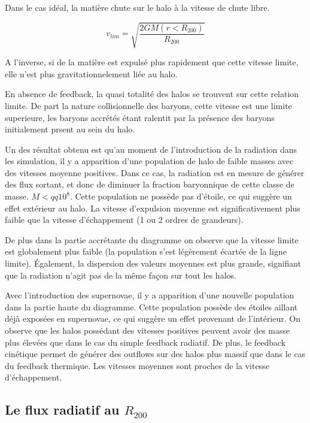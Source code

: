 Dans le cas idéal, la matière chute sur le halo à la vitesse de chute libre.

\begin{equation}
v_{lim} = \sqrt{\frac{2 GM (r<R_{200})} {R_{200}} } 
\end{equation}

A l'inverse, si de la matière est expulsé plus rapidement que cette vitesse limite, elle n'est plus gravitationnelement liée au halo.

En absence de feedback, la quasi totalité des halos se trouvent sur cette relation limite.
De part la nature collisionnelle des baryons, cette vitesse est une limite superieure, les baryons accrétés étant ralentit par la présence des baryons initialement prsent au sein du halo.

Un des résultat obtenu est qu'au moment de l'introduction de la radiation dans les simulation, il y a apparition d'une population de halo de faible masses avec des vitesses moyenne positives.
Dans ce cas, la radiation est en mesure de générer des flux sortant, et donc de diminuer la fraction baryonnique de cette classe de masse. $M<qq 10^8$.
Cette population ne possède pas d'étoile, ce qui suggère un effet extérieur au halo.
La vitesse d'expulsion moyenne est significativement plus faible que la vitesse d'échappement (1 ou 2 ordres de grandeurs).

De plus dans la partie accrétante du diagramme on observe que la vitesse limite est globalement plus faible (la population s'est légèrement écartée de la ligne limite).
Également, la dispersion des valeurs moyennes est plus grande, signifiant que la radiation n'agit pas de la même façon sur tout les halos.

Avec l'introduction des supernovae, il y a apparition d'une nouvelle population dans la partie haute du diagramme.
Cette population possède des étoiles aillant déjà exposées en supernovae, ce qui suggère un effet provenant de l'intérieur.
On observe que les halos possédant des vitesses positives peuvent avoir des masse plus élevées que dans le cas du simple feedback radiatif.
De plus, le feedback cinétique permet de générer des outflows sur des halos plus massif que dans le cas du feedback thermique.
Les vitesses moyennes sont proches de la vitesse d'échappement.

\subsection{Le flux radiatif au $R_{200}$}

